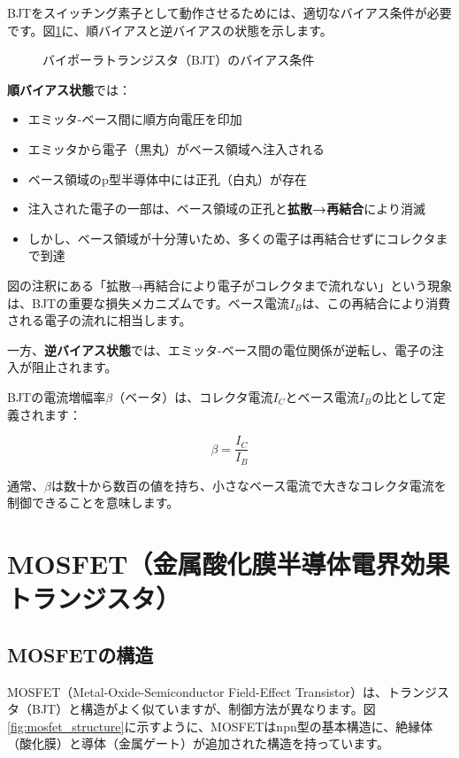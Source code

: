 BJTをスイッチング素子として動作させるためには、適切なバイアス条件が必要です。図\ref{fig:bjt_bias}に、順バイアスと逆バイアスの状態を示します。

\begin{figure}[H]
\centering
{}
\caption{バイポーラトランジスタ（BJT）のバイアス条件}
\label{fig:bjt_bias}
\end{figure}

\textbf{順バイアス状態}では：

\begin{itemize}
\item エミッタ-ベース間に順方向電圧を印加
\item エミッタから電子（黒丸）がベース領域へ注入される
\item ベース領域のp型半導体中には正孔（白丸）が存在
\item 注入された電子の一部は、ベース領域の正孔と\textbf{拡散→再結合}により消滅
\item しかし、ベース領域が十分薄いため、多くの電子は再結合せずにコレクタまで到達
\end{itemize}

図の注釈にある「拡散→再結合により電子がコレクタまで流れない」という現象は、BJTの重要な損失メカニズムです。ベース電流$I_B$は、この再結合により消費される電子の流れに相当します。

一方、\textbf{逆バイアス状態}では、エミッタ-ベース間の電位関係が逆転し、電子の注入が阻止されます。

BJTの電流増幅率$\beta$（ベータ）は、コレクタ電流$I_C$とベース電流$I_B$の比として定義されます：

\begin{equation}
\beta = \frac{I_C}{I_B}
\end{equation}

通常、$\beta$は数十から数百の値を持ち、小さなベース電流で大きなコレクタ電流を制御できることを意味します。

\section{MOSFET（金属酸化膜半導体電界効果トランジスタ）}

\subsection{MOSFETの構造}

MOSFET（Metal-Oxide-Semiconductor Field-Effect Transistor）は、トランジスタ（BJT）と構造がよく似ていますが、制御方法が異なります。図\ref{fig:mosfet_structure}に示すように、MOSFETはnpn型の基本構造に、絶縁体（酸化膜）と導体（金属ゲート）が追加された構造を持っています。

